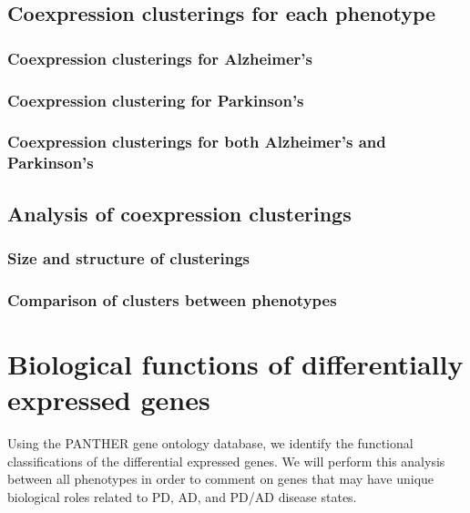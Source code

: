 \subsection{Coexpression clusterings for each phenotype}
\label{subsec:coexpr-clust-each}

\subsubsection{Coexpression clusterings for Alzheimer's}
\label{subsubsec:coexpr-clust-alzh}

\subsubsection{Coexpression clustering for Parkinson's}
\label{subsubsec:coexpr-clust-park}

\subsubsection{Coexpression clusterings for both Alzheimer's and Parkinson's}
\label{subsubsec:coexpr-clust-both}


\subsection{Analysis of coexpression clusterings}
\label{subsec:analys-coexpr-clust}

\subsubsection{Size and structure of clusterings}
\label{subsec:size-struct-clust}

\subsubsection{Comparison of clusters between phenotypes}
\label{subsec:comp-clust-betw}




\section{Biological functions of differentially expressed genes}
\label{sec:biol-funct-diff}

Using the PANTHER gene ontology database, we identify the functional classifications of the differential expressed genes. We will perform this analysis between all phenotypes in order to comment on genes that may have unique biological roles related to PD, AD, and PD/AD disease states.



